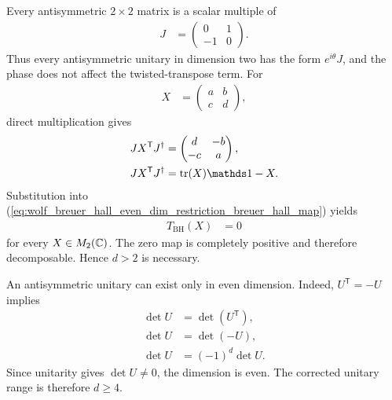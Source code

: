 \documentclass{article}
\begin{document}
Every antisymmetric $2\times2$ matrix is a scalar multiple of
\begin{align}
    J
        &=\begin{pmatrix}
            0 & 1\\
            -1 & 0
          \end{pmatrix}.
    \label{eq:wolf_breuer_hall_even_dim_restriction_symplectic_matrix}
\end{align}
Thus every antisymmetric unitary in dimension two has the form
$e^{i\theta}J$, and the phase does not affect the twisted-transpose term.
For
\begin{align}
    X
        &=\begin{pmatrix}
            a & b\\
            c & d
          \end{pmatrix},
    \label{eq:wolf_breuer_hall_even_dim_restriction_generic_two_matrix}
\end{align}
direct multiplication gives
\begin{align}
    JX^{\mathsf T}J^\dagger
        &=\begin{pmatrix}
            d & -b\\
            -c & a
          \end{pmatrix},
    \label{eq:wolf_breuer_hall_even_dim_restriction_twisted_transpose_matrix}\\
    JX^{\mathsf T}J^\dagger
        &=\tr(X)\Id-X.
    \label{eq:wolf_breuer_hall_even_dim_restriction_twisted_transpose_reduction}
\end{align}
Substitution into
(\ref{eq:wolf_breuer_hall_even_dim_restriction_breuer_hall_map}) yields
\begin{align}
    T_{\mathrm{BH}}(X)
        &=0
    \label{eq:wolf_breuer_hall_even_dim_restriction_dimension_two_zero}
\end{align}
for every $X\in M_2(\mathbb{C})$. The zero map is completely positive and therefore
decomposable. Hence $d>2$ is necessary.

An antisymmetric unitary can exist only in even dimension. Indeed,
$U^{\mathsf T}=-U$ implies
\begin{align}
    \det U
        &=\det(U^{\mathsf T}),
    \label{eq:wolf_breuer_hall_even_dim_restriction_determinant_transpose}\\
    \det U
        &=\det(-U),
    \label{eq:wolf_breuer_hall_even_dim_restriction_determinant_antisymmetry}\\
    \det U
        &=(-1)^d\det U.
    \label{eq:wolf_breuer_hall_even_dim_restriction_determinant_parity}
\end{align}
Since unitarity gives $\det U\neq0$, the dimension is even. The corrected
unitary range is therefore $d\geq4$.
\end{document}
